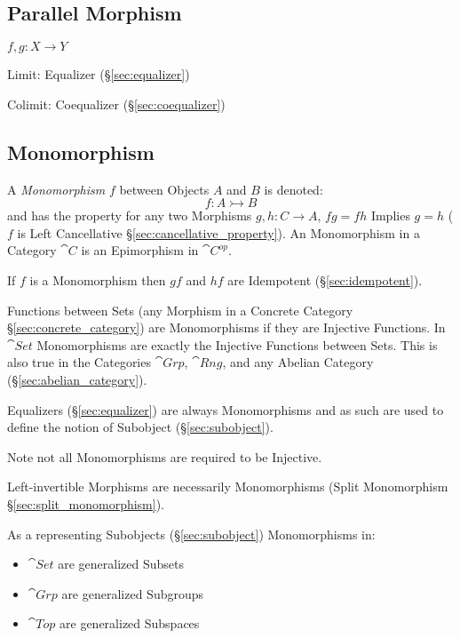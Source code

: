 \subsection{Parallel Morphism}\label{sec:parallel_morphism}

$f,g : X \rightarrow Y$

Limit: Equalizer (\S\ref{sec:equalizer})

Colimit: Coequalizer (\S\ref{sec:coequalizer})



\subsection{Monomorphism}\label{sec:monomorphism}

A \emph{Monomorphism} $f$ between Objects $A$ and $B$ is denoted:
\[
  f : A \rightarrowtail B
\]
and has the property for any two Morphisms $g, h : C \rightarrow A$,
$fg = fh$ Implies $g = h$ ($f$ is Left Cancellative
\S\ref{sec:cancellative_property}). An Monomorphism in a Category
$\cat{C}$ is an Epimorphism in $\cat{C^{op}}$.

If $f$ is a Monomorphism then $gf$ and $hf$ are Idempotent
(\S\ref{sec:idempotent}). %

Functions between Sets (any Morphism in a Concrete Category
\S\ref{sec:concrete_category}) are Monomorphisms if they are Injective
Functions. In $\cat{Set}$ Monomorphisms are exactly the Injective
Functions between Sets. This is also true in the Categories
$\cat{Grp}$, $\cat{Rng}$, and any Abelian Category
(\S\ref{sec:abelian_category}).

Equalizers (\S\ref{sec:equalizer}) are always Monomorphisms and as
such are used to define the notion of Subobject
(\S\ref{sec:subobject}).

\fist Note not all Monomorphisms are required to be Injective.

Left-invertible Morphisms are necessarily Monomorphisms (Split
Monomorphism \S\ref{sec:split_monomorphism}).

As a representing Subobjects (\S\ref{sec:subobject}) Monomorphisms in:
\begin{itemize}
  \item $\cat{Set}$ are generalized Subsets
  \item $\cat{Grp}$ are generalized Subgroups
  \item $\cat{Top}$ are generalized Subspaces
\end{itemize}



